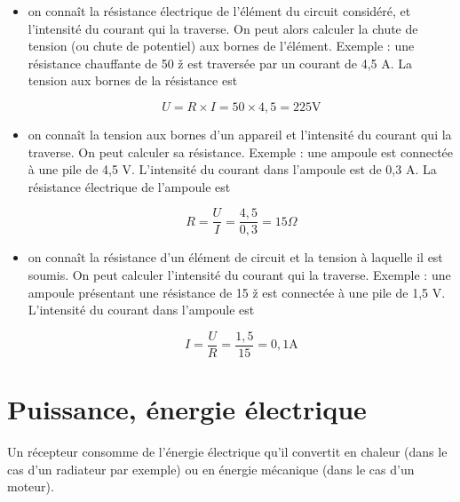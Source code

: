 \begin{itemize}
\item on connaît la résistance électrique de l’élément du circuit considéré, et l’intensité du courant qui la traverse. On peut alors calculer la chute de tension (ou chute de potentiel) aux bornes de l’élément.
Exemple : une résistance chauffante de 50 ž est traversée par un courant de 4,5 A. La tension aux bornes de la résistance est


\begin{equation}
    U = R \times I = 50 \times 4,5 = 225 \text{V}
\end{equation}



 \item on connaît la tension aux bornes d’un appareil et l’intensité du courant qui la traverse. On peut calculer sa résistance.
Exemple : une ampoule est connectée à une pile de 4,5 V. L’intensité du courant dans l’ampoule est de 0,3 A. 
La résistance électrique de l’ampoule est



\begin{equation}
 R = \frac{U}{I} = \frac{4,5}{0,3} = 15 \Omega   
\end{equation}


\item  on connaît la résistance d’un élément de circuit et la tension à laquelle il est soumis. On peut calculer l’intensité du courant qui la traverse.
Exemple : une ampoule présentant une résistance de 15 ž est connectée à une pile 
de 1,5 V. 
L’intensité du courant dans l’ampoule est



\begin{equation}
   I = \frac{U}{R} = \frac{1,5}{15} = 0,1 \text{A} 
\end{equation}


\end{itemize}


\section{ Puissance, énergie électrique}


Un récepteur consomme de l’énergie électrique qu’il convertit en chaleur (dans le cas d’un radiateur par exemple) ou en énergie mécanique (dans le cas d’un moteur).
\vspace{0.3cm}

